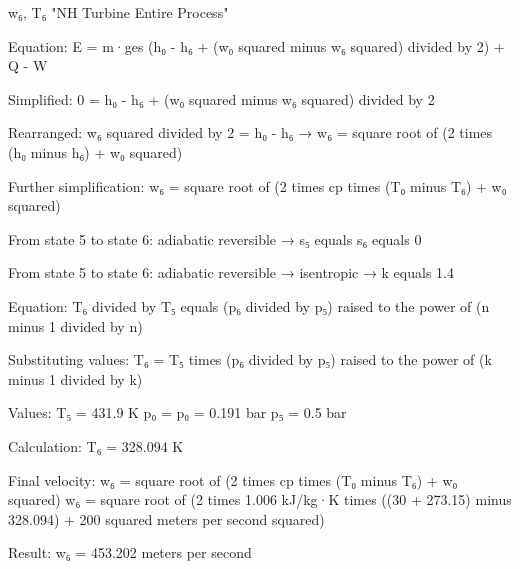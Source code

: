 w₆, T₆  
"NH Turbine Entire Process"  

Equation:  
E = m·ges (h₀ - h₆ + (w₀ squared minus w₆ squared) divided by 2) + Q - W  

Simplified:  
0 = h₀ - h₆ + (w₀ squared minus w₆ squared) divided by 2  

Rearranged:  
w₆ squared divided by 2 = h₀ - h₆ → w₆ = square root of (2 times (h₀ minus h₆) + w₀ squared)  

Further simplification:  
w₆ = square root of (2 times cp times (T₀ minus T₆) + w₀ squared)  

From state 5 to state 6:  
adiabatic reversible → s₅ equals s₆ equals 0  

From state 5 to state 6:  
adiabatic reversible → isentropic → k equals 1.4  

Equation:  
T₆ divided by T₅ equals (p₆ divided by p₅) raised to the power of (n minus 1 divided by n)  

Substituting values:  
T₆ = T₅ times (p₆ divided by p₅) raised to the power of (k minus 1 divided by k)  

Values:  
T₅ = 431.9 K  
p₀ = p₀ = 0.191 bar  
p₅ = 0.5 bar  

Calculation:  
T₆ = 328.094 K  

Final velocity:  
w₆ = square root of (2 times cp times (T₀ minus T₆) + w₀ squared)  
w₆ = square root of (2 times 1.006 kJ/kg·K times ((30 + 273.15) minus 328.094) + 200 squared meters per second squared)  

Result:  
w₆ = 453.202 meters per second